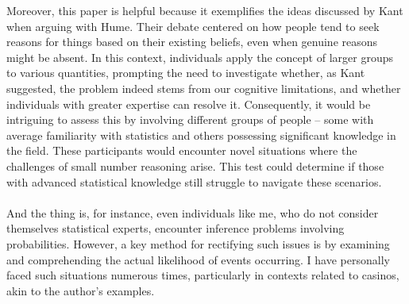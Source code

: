 \documentclass[11pt]{article}
\begin{document}
\begin{flushleft}
    Moreover, this paper is helpful because it exemplifies the ideas discussed by Kant when arguing with Hume. Their debate centered on how people tend to seek reasons for things based on their existing beliefs, even when genuine reasons might be absent. In this context, individuals apply the concept of larger groups to various quantities, prompting the need to investigate whether, as Kant suggested, the problem indeed stems from our cognitive limitations, and whether individuals with greater expertise can resolve it. Consequently, it would be intriguing to assess this by involving different groups of people – some with average familiarity with statistics and others possessing significant knowledge in the field. These participants would encounter novel situations where the challenges of small number reasoning arise. This test could determine if those with advanced statistical knowledge still struggle to navigate these scenarios.\\~\\
    
    And the thing is, for instance, even individuals like me, who do not consider themselves statistical experts, encounter inference problems involving probabilities. However, a key method for rectifying such issues is by examining and comprehending the actual likelihood of events occurring. I have personally faced such situations numerous times, particularly in contexts related to casinos, akin to the author's examples.\\~\\
\end{flushleft}
\newpage
\medskip

\nocite{*}
 

\newpage
\end{document}
